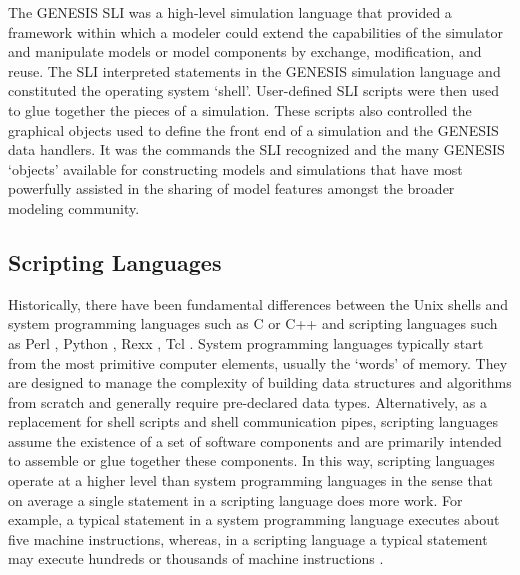 \documentclass[10pt]{article}
\begin{document}
The GENESIS SLI was a high-level simulation language that provided a
framework within which a modeler could extend the capabilities of the
simulator and manipulate models or model components by exchange,
modification, and reuse. The SLI interpreted statements in the GENESIS
simulation language and constituted the operating system `shell'.
User-defined SLI scripts were then used to glue together the pieces of
a simulation. These scripts also controlled the graphical objects used
to define the front end of a simulation and the GENESIS data handlers.
It was the commands the SLI recognized and the many GENESIS `objects'
available for constructing models and simulations that have most powerfully
assisted in the sharing of model features amongst the broader modeling
community.

\subsection*{Scripting Languages}

Historically, there have been fundamental differences between the Unix
shells and system programming languages such as C or C++ and scripting
languages such as Perl \cite{wall99:_perl_progr_refer_guide},
Python \cite{martelli06:_python_nutsh},
Rexx \cite{ohara88:_moder_progr_using_rexx},
Tcl \cite{ousterhout94:_tcl_tk_toolk}.  System
programming languages typically start from the most primitive computer
elements, usually the `words' of memory. They are designed to manage
the complexity of building data structures and algorithms from scratch
and generally require pre-declared data types.  Alternatively, as a
replacement for shell scripts and shell communication pipes, scripting
languages assume the existence of a set of software components and are
primarily intended to assemble or glue together these components.
In this way, scripting languages operate at a higher level than system
programming languages in the sense that on average a single statement
in a scripting language does more work.  For example, a typical statement in a system
programming language executes about five machine instructions, whereas,
in a scripting language a typical statement may execute hundreds or thousands of machine instructions \cite{ousterhout98:_scrip}.
\end{document}
